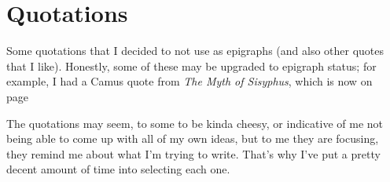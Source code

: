 \documentclass[../butidigress.tex]{subfiles}
\begin{document}
\chapter{Quotations}\label{chap:quotations}
\newpage
\newlength{\episkip}
\setlength{\episkip}{0.5cm}
\newcommand{\postepi}{}
Some quotations that I decided to not use as epigraphs (and also other quotes that I like).
Honestly, some of these may be upgraded to epigraph status; for example, I had a Camus quote from \textit{The Myth of Sisyphus}, which is now on page~\pageref{sec:voidexpounding}

The quotations may seem, to some to be kinda cheesy, or indicative of me not being able to come up with all of my own ideas, but to me they are focusing, they remind me about what I'm trying to write.
That's why I've put a pretty decent amount of time into selecting each one.
\end{document}

